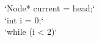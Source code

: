 \documentclass[preview]{standalone}
\begin{document}
`Node* current = head;`\\`int i = 0;`\\`while (i < 2)`\\
\end{document}
